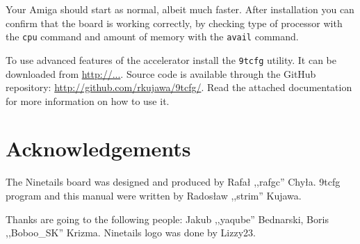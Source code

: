 \documentclass[10pt,a5paper]{article}
\begin{document}
Your Amiga should start as normal, albeit much faster. After installation you can confirm that the board is working correctly, by checking type of processor with the {\tt cpu} command and amount of memory with the {\tt avail} command.

To use advanced features of the accelerator install the {\tt 9tcfg} utility. It can be downloaded from \url{http://...}. Source code is available through the GitHub repository: \url{http://github.com/rkujawa/9tcfg/}. Read the attached documentation for more information on how to use it. 

\section*{Acknowledgements}

The Ninetails board was designed and produced by Rafał ,,rafgc'' Chyła. 9tcfg program and this manual were written by Radosław ,,strim'' Kujawa.

Thanks are going to the following people: Jakub ,,yaqube'' Bednarski, Boris ,,Boboo\_SK'' Krizma. Ninetails logo was done by Lizzy23.
\end{document}

